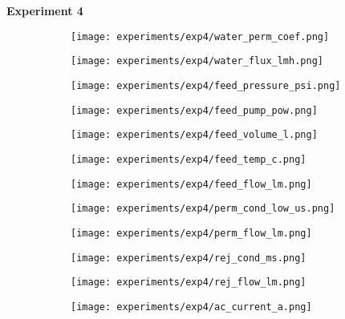 \documentclass{article}
\begin{document}
    \pagebreak
    
    \textbf{Experiment 4}
    \begin{figure}[H]
        \centering
        \begin{subfigure}{0.48\linewidth}
		    \texttt{[image: experiments/exp4/water\_perm\_coef.png]}
	    \end{subfigure}
	    \begin{subfigure}{0.48\linewidth}
		    \texttt{[image: experiments/exp4/water\_flux\_lmh.png]}
	    \end{subfigure}
	    \begin{subfigure}{0.48\linewidth}
		    \texttt{[image: experiments/exp4/feed\_pressure\_psi.png]}
	    \end{subfigure}
	    \begin{subfigure}{0.48\linewidth}
		    \texttt{[image: experiments/exp4/feed\_pump\_pow.png]}
	    \end{subfigure}
	    \begin{subfigure}{0.48\linewidth}
		    \texttt{[image: experiments/exp4/feed\_volume\_l.png]}
	    \end{subfigure}
	    \begin{subfigure}{0.48\linewidth}
		    \texttt{[image: experiments/exp4/feed\_temp\_c.png]}
	    \end{subfigure}
	    \begin{subfigure}{0.48\linewidth}
		    \texttt{[image: experiments/exp4/feed\_flow\_lm.png]}
	    \end{subfigure}
	    \begin{subfigure}{0.48\linewidth}
		    \texttt{[image: experiments/exp4/perm\_cond\_low\_us.png]}
	    \end{subfigure}
	    \begin{subfigure}{0.48\linewidth}
		    \texttt{[image: experiments/exp4/perm\_flow\_lm.png]}
	    \end{subfigure}
	    \begin{subfigure}{0.48\linewidth}
		    \texttt{[image: experiments/exp4/rej\_cond\_ms.png]}
	    \end{subfigure}
	    \begin{subfigure}{0.48\linewidth}
		    \texttt{[image: experiments/exp4/rej\_flow\_lm.png]}
	    \end{subfigure}
	    \begin{subfigure}{0.48\linewidth}
		    \texttt{[image: experiments/exp4/ac\_current\_a.png]}
	    \end{subfigure}
    \end{figure}
    
\end{document}
